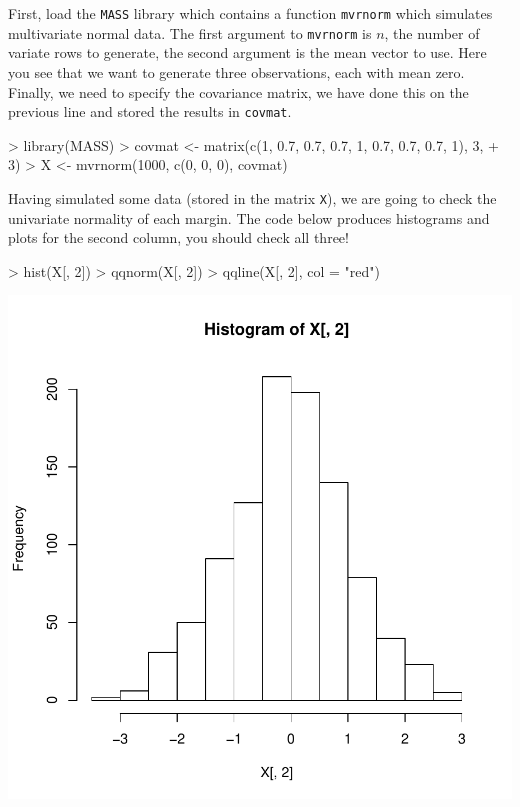 \documentclass[11pt]{article}
\begin{document}
First, load the \texttt{MASS} library which contains a function \texttt{mvrnorm} which simulates multivariate normal data.   The first argument to \texttt{mvrnorm} is $n$, the number of variate rows to generate, the second argument is the mean vector to use.   Here you see that we want to generate three observations, each with mean zero.   Finally, we need to specify the covariance matrix, we have done this on the previous line and stored the results in \texttt{covmat}.


\begin{Schunk}
\begin{Sinput}
> library(MASS)
> covmat <- matrix(c(1, 0.7, 0.7, 0.7, 1, 0.7, 0.7, 0.7, 1), 3, 
+     3)
> X <- mvrnorm(1000, c(0, 0, 0), covmat)
\end{Sinput}
\end{Schunk}


Having simulated some data (stored in the matrix \texttt{X}), we are going to check the univariate normality of each margin.   The code below produces histograms and plots for the second column, you should check all three!

\begin{Schunk}
\begin{Sinput}
> hist(X[, 2])
> qqnorm(X[, 2])
> qqline(X[, 2], col = "red")
\end{Sinput}
\end{Schunk}
\includegraphics{STAT3401Lab1-uvnorm}
\end{document}
